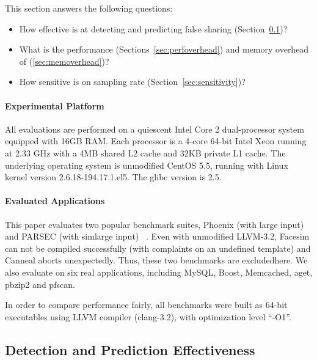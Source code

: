 \label{sec:evaluation}

This section answers the following questions:
\begin{itemize}
\item
  How effective is \Predator{} at detecting and predicting false sharing (Section~\ref{sec:effective})?

\item
  What is the performance (Sections~\ref{sec:perfoverhead}) and memory overhead of \Predator{} (\ref{sec:memoverhead})?

\item 
  How sensitive is \Predator{} on sampling rate (Section~\ref{sec:sensitivity})? 
 
\end{itemize}

\paragraph{Experimental Platform} All evaluations are performed on a quiescent Intel Core 2 dual-processor system equipped with 
16GB RAM. Each processor is a 4-core 64-bit Intel Xeon running at 2.33 GHz with a 4MB shared L2 cache and 32KB private L1 cache. The underlying operating system is unmodified CentOS 5.5, running with Linux kernel version 2.6.18-194.17.1.el5. The glibc version is 2.5. %

\paragraph{Evaluated Applications} 
This paper evaluates two popular benchmark suites,
Phoenix (with large input) ~\cite{phoenix-hpca} and PARSEC (with simlarge input) ~\cite{parsec}. Even with unmodified LLVM-3.2, Facesim can not be compiled successfully (with complaints on an undefined template) and Canneal aborts unexpectedly. Thus, these two benchmarks are excludedhere.
We also evaluate \Predator{} on six real applications, including MySQL, Boost, Memcached, aget, pbzip2 and pfscan.

In order to compare performance fairly, all benchmarks were built as 64-bit executables using LLVM compiler (clang-3.2), with optimization level ``-O1''.

\subsection{Detection and Prediction Effectiveness}
\label{sec:effective}

